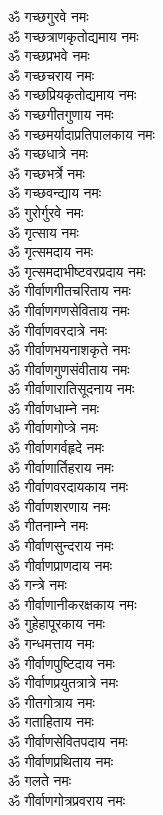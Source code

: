 \begin{multicols}{2}
\begin{flushleft}
ॐ गच्छगुरवे नमः\\
ॐ गच्छत्राणकृतोद्यमाय नमः\hfill{}\\
ॐ गच्छप्रभवे नमः\\
ॐ गच्छचराय नमः\\
ॐ गच्छप्रियकृतोद्यमाय नमः\\
ॐ गच्छगीतगुणाय नमः\\
ॐ गच्छमर्यादाप्रतिपालकाय नमः\\
ॐ गच्छधात्रे नमः\\
ॐ गच्छभर्त्रे नमः\\
ॐ गच्छवन्द्याय नमः\\
ॐ गुरोर्गुरवे नमः\\
ॐ गृत्साय नमः\hfill{}\\
ॐ गृत्समदाय नमः\\
ॐ गृत्समदाभीष्टवरप्रदाय नमः\\
ॐ गीर्वाणगीतचरिताय नमः\\
ॐ गीर्वाणगणसेविताय नमः\\
ॐ गीर्वाणवरदात्रे नमः\\
ॐ गीर्वाणभयनाशकृते नमः\\
ॐ गीर्वाणगुणसंवीताय नमः\\
ॐ गीर्वाणारातिसूदनाय नमः\\
ॐ गीर्वाणधाम्ने नमः\\
ॐ गीर्वाणगोप्त्रे नमः\hfill{}\\
ॐ गीर्वाणगर्वहृदे नमः\\
ॐ गीर्वाणार्तिहराय नमः\\
ॐ गीर्वाणवरदायकाय नमः\\
ॐ गीर्वाणशरणाय नमः\\
ॐ गीतनाम्ने नमः\\
ॐ गीर्वाणसुन्दराय नमः\\
ॐ गीर्वाणप्राणदाय नमः\\
ॐ गन्त्रे नमः\\
ॐ गीर्वाणानीकरक्षकाय नमः\\
ॐ गुहेहापूरकाय नमः\hfill{}\\
ॐ गन्धमत्ताय नमः\\
ॐ गीर्वाणपुष्टिदाय नमः\\
ॐ गीर्वाणप्रयुतत्रात्रे नमः\\
ॐ गीतगोत्राय नमः\\
ॐ गताहिताय नमः\\
ॐ गीर्वाणसेवितपदाय नमः\\
ॐ गीर्वाणप्रथिताय नमः\\
ॐ गलते नमः\\
ॐ गीर्वाणगोत्रप्रवराय नमः\\

\end{flushleft}
\end{multicols}
